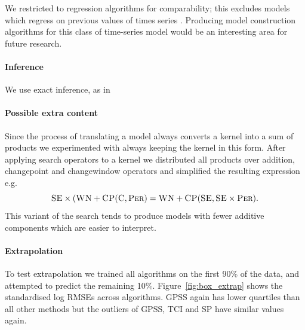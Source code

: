 \documentclass{article}
\def\eg{e.g.\ }
\begin{document}
We restricted to regression algorithms for comparability; this excludes models which regress on previous values of times series \citep[e.g.][]{box2013time}.
Producing model construction algorithms for this class of time-series model would be an interesting area for future research.

\paragraph{Inference}

We use exact inference, as in \cite{DuvLloGroetal13}

\paragraph{Possible extra content}


Since the process of translating a model always converts a kernel into a sum of products we experimented with always keeping the kernel in this form.
After applying search operators to a kernel we distributed all products over addition, changepoint and changewindow operators and simplified the resulting expression \eg
\begin{equation}
{\textsc{SE}} \times ({\textsc{WN}} + {\textsc{CP}}({\textsc{C}}, {\textsc{Per}}) = {\textsc{WN}} + {\textsc{CP}}({\textsc{SE}}, {\textsc{SE}} \times {\textsc{Per}}).
\end{equation}
This variant of the search tends to produce models with fewer additive components which are easier to interpret.



\paragraph{Extrapolation}

To test extrapolation we trained all algorithms on the first 90\% of the data, and attempted to predict the remaining 10\%.
Figure~\ref{fig:box_extrap} shows the standardised log RMSEs across algorithms.
GPSS again has lower quartiles than all other methods but the outliers of GPSS, TCI and SP have similar values again.


\end{document}
